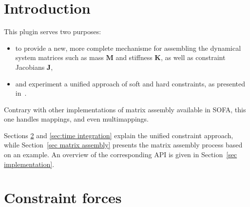 \newcommand{\vect}[1]{\mathbf{#1}}
\newcommand{\mat}[1]{\mathbf{#1}}

\newcommand{\pos}{\vect{x}}
\newcommand{\dx}{\vect{\Delta x}}
\newcommand{\xcur}{\vect{x}_{n}}
\newcommand{\xnext}{\vect{x}_{n+1}}
\newcommand{\vel}{\vect{v}}
\newcommand{\dv}{\vect{\Delta v}}
\newcommand{\vcur}{\vect{v}_{n}}
\newcommand{\vnext}{\vect v_{n+1}}
\newcommand{\acc}{\vect{a}}
\newcommand{\force}{\vect{f}}
\newcommand{\forcext}{\vect{f}_{ext}} 
\newcommand{\lam}{\vect{\lambda}}
\newcommand{\lcur}{\lam_{n}}
\newcommand{\lnext}{\lam_{n+1}}
\newcommand{\avlam}{\bar{\lam}}
\newcommand{\fcur}{\vect{f}_{n}}
\newcommand{\fnext}{\vect f_{n+1}}
\newcommand{\M}{\mat M}
\newcommand{\Minv}{\mat M^{-1}}
\renewcommand{\P}{\mat P}
\newcommand{\J}{\mat J}
\newcommand{\Jt}{\mat J^T}
\newcommand{\C}{\mat C}
\newcommand{\K}{\mat K}
\newcommand{\violation}{ \phi}
\newcommand{\dviolation}{\dot \violation}
\newcommand{\violcur}{\violation_{n}}
\newcommand{\dviolcur}{\dot \violcur}
\newcommand{\violnext}{\violation_{n+1}}
\newcommand{\dviolnext}{\dot \violation_{n+1}}
\newcommand{\cmp}{c}
\newcommand{\dampingratio}{d}

\section{Introduction}
This plugin serves two purposes:
\begin{itemize}
 \item to provide a new, more complete mechanisme for assembling the dynamical system matrices such as mass $\M$ and stiffness $\K$, as well as constraint Jacobians $\J$,
 \item and experiment a unified approach of soft and hard constraints, as presented in~\cite{servin2006interactive}.
\end{itemize}
Contrary with other implementations of matrix assembly available in SOFA, this one handles mappings, and even multimappings.

Sections \ref{sec constraint forces} and \ref{sec:time integration} explain the unified constraint approach, while Section~\ref{sec matrix assembly} presents the matrix assembly process based on an example. An overview of the corresponding API is given in Section~\ref{sec implementation}. 

\section{Constraint forces} \label{sec constraint forces}
